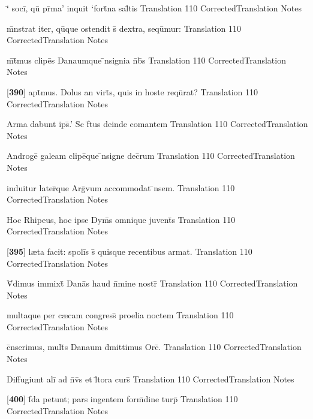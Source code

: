 \latline
  {`\={} soci\={\macron {\i}}, qu\={} pr\={\macron {\i}}ma' inquit `fort\={}na sal\={}tis}
  { Translation }
  {110}
  { CorrectedTranslation }
  { Notes }


\latline
  {m\={}nstrat iter, qu\={}que ostendit s\={} dextra, sequ\={}mur:}
  { Translation }
  {110}
  { CorrectedTranslation }
  { Notes }


\latline
  {m\={}t\={}mus clipe\={}s Danaumque \={\macron {\i}}nsignia n\={}b\={\macron {\i}}s}
  { Translation }
  {110}
  { CorrectedTranslation }
  { Notes }


\latline
  {[\textbf{390}] apt\={}mus.  Dolus an virt\={}s, quis in hoste requ\={\macron {\i}}rat?}
  { Translation }
  {110}
  { CorrectedTranslation }
  { Notes }


\latline
  {Arma dabunt ips\={\macron {\i}}.'  S\={\macron {\i}}c f\={}tus deinde comantem}
  { Translation }
  {110}
  { CorrectedTranslation }
  { Notes }


\latline
  {Androge\={} galeam clipe\={\macron {\i}}que \={\macron {\i}}nsigne dec\={}rum}
  { Translation }
  {110}
  { CorrectedTranslation }
  { Notes }


\latline
  {induitur later\={\macron {\i}}que Arg\={\macron {\i}}vum accommodat \={}nsem.  }
  { Translation }
  {110}
  { CorrectedTranslation }
  { Notes }


\latline
  {Hoc Rhipeus, hoc ipse Dym\={}s omnique juvent\={}s}
  { Translation }
  {110}
  { CorrectedTranslation }
  { Notes }


\latline
  {[\textbf{395}] l{\ae}ta facit:  spoli\={\macron {\i}}s s\={} quisque recentibus armat.}
  { Translation }
  {110}
  { CorrectedTranslation }
  { Notes }


\latline
  {V\={}dimus immixt\={\macron {\i}} Dana\={\macron {\i}}s haud n\={}mine nostr\={}}
  { Translation }
  {110}
  { CorrectedTranslation }
  { Notes }


\latline
  {multaque per c{\ae}cam congress\={\macron {\i}} proelia noctem}
  { Translation }
  {110}
  { CorrectedTranslation }
  { Notes }


\latline
  {c\={}nserimus, mult\={}s Danaum d\={}mittimus Orc\={}.}
  { Translation }
  {110}
  { CorrectedTranslation }
  { Notes }


\latline
  {Diffugiunt ali\={\macron {\i}} ad n\={}v\={\macron {\i}}s et l\={\macron {\i}}tora curs\={}}
  { Translation }
  {110}
  { CorrectedTranslation }
  { Notes }


\latline
  {[\textbf{400}] f\={\macron {\i}}da petunt; pars ingentem form\={\macron {\i}}dine turp\={\macron {\i}}}
  { Translation }
  {110}
  { CorrectedTranslation }
  { Notes }


